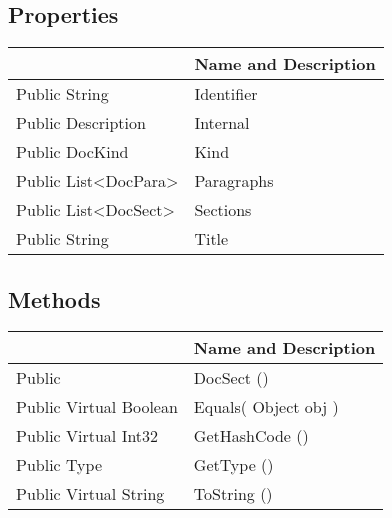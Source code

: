 \documentclass[11pt, oneside, a4paper]{book}
\begin{document}
\subsection{Properties}
\begin{center}
\begin{tabular}{| p{3cm} | p{12cm} | }
\hline
\textbf{ } & \textbf{ Name and Description}\\
\hline
 Public  String &  Identifier\hypertarget{SoftwareEngineeringTools.{}Documentation.{}DocSect.{}Identifier}{}\\
\hline
 Public  Description &  Internal\hypertarget{SoftwareEngineeringTools.{}Documentation.{}DocSect.{}Internal}{}\\
\hline
 Public  DocKind &  Kind\hypertarget{SoftwareEngineeringTools.{}Documentation.{}DocSect.{}Kind}{}\\
\hline
 Public  List<DocPara> &  Paragraphs\hypertarget{SoftwareEngineeringTools.{}Documentation.{}DocSect.{}Paragraphs}{}\\
\hline
 Public  List<DocSect> &  Sections\hypertarget{SoftwareEngineeringTools.{}Documentation.{}DocSect.{}Sections}{}\\
\hline
 Public  String &  Title\hypertarget{SoftwareEngineeringTools.{}Documentation.{}DocSect.{}Title}{}\\
\hline
\end{tabular}
\end{center}

\subsection{Methods}
\begin{center}
\begin{tabular}{| p{3cm} | p{12cm} | }
\hline
\textbf{ } & \textbf{ Name and Description}\\
\hline
 Public  &  DocSect ()\hypertarget{SoftwareEngineeringTools.{}Documentation.{}DocSect.{}DocSect}{}\\
\hline
 Public  Virtual  Boolean &  Equals(\hypertarget{SoftwareEngineeringTools.{}Documentation.{}DocSect.{}Equals\_Object}{} Object  obj  )\\
\hline
 Public  Virtual  Int32 &  GetHashCode ()\hypertarget{SoftwareEngineeringTools.{}Documentation.{}DocSect.{}GetHashCode}{}\\
\hline
 Public  Type &  GetType ()\hypertarget{SoftwareEngineeringTools.{}Documentation.{}DocSect.{}GetType}{}\\
\hline
 Public  Virtual  String &  ToString ()\hypertarget{SoftwareEngineeringTools.{}Documentation.{}DocSect.{}ToString}{}\\
\hline
\end{tabular}
\end{center}
 
\end{document}
